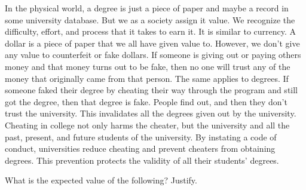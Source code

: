 \documentclass{article}
\begin{document}
In the physical world, a degree is just a piece of paper and maybe a record in some university database. But we as a society assign it value. We recognize the difficulty, effort, and process that it takes to earn it. It is similar to currency. A dollar is a piece of paper that we all have given value to. However, we don't give any value to counterfeit or fake dollars. If someone is giving out or paying others money and that money turns out to be fake, then no one will trust any of the money that originally came from that person. The same applies to degrees. If someone faked their degree by cheating their way through the program and still got the degree, then that degree is fake. People find out, and then they don't trust the university. This invalidates all the degrees given out by the university. Cheating in college not only harms the cheater, but the university and all the past, present, and future students of the university. By instating a code of conduct, universities reduce cheating and prevent cheaters from obtaining degrees. This prevention protects the validity of all their students' degrees.



 

What is the expected value of the following? Justify.
\end{document}
